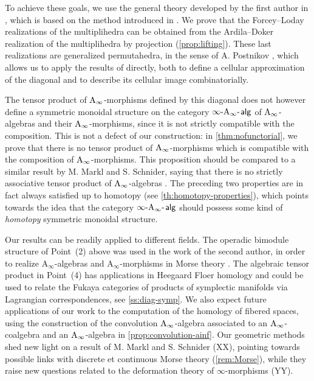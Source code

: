 \documentclass[twoside, 11pt]{amsart}
\theoremstyle{remark}
\begin{document}
To achieve these goals, we use the general theory developed by the first author in \cite{LA21}, which is based on the method introduced in \cite{MTTV19}.
We prove that the Forcey--Loday realizations of the multiplihedra \cite{Forcey08} can be obtained from the Ardila--Doker realization of the multiplihedra \cite{AD13} by projection (\cref{prop:lifting}).
These last realizations are generalized permutahedra, in the sense of A. Postnikov \cite{Postnikov09}, which allows us to apply the results of \cite{LA21} directly, both to define a cellular approximation of the diagonal and to describe its cellular image combinatorially.

The tensor product of $\mathrm{A}_\infty$-morphisms defined by this diagonal does not however define a symmetric monoidal structure on the category $\infty\text{-}\mathrm{A}_\infty\text{-\hspace{1pt}}\mathsf{alg}$ of $\mathrm{A}_\infty$-algebras and their $\mathrm{A}_\infty$-morphisms, since it is not strictly compatible with the composition. 
This is not a defect of our construction: in \cref{thm:nofunctorial}, we prove that there is no tensor product of $\mathrm{A}_\infty$-morphisms which is compatible with the composition of $\mathrm{A}_\infty$-morphisms. 
This proposition should be compared to a similar result by M. Markl and S. Schnider, saying that there is no strictly associative tensor product of $\mathrm{A}_\infty$-algebras \cite[Theorem 13]{MarklShnider06}.
The preceding two properties are in fact always satisfied up to homotopy (see \cref{th:homotopy-properties}), which points towards the idea that the category $\infty\text{-}\mathrm{A}_\infty\text{-\hspace{1pt}}\mathsf{alg}$ should possess some kind of \textit{homotopy} symmetric monoidal structure. 


Our results can be readily applied to different fields. 
The operadic bimodule structure of Point~(2) above was used in the work of the second author, in order to realize $\mathrm{A}_\infty$-algebras and $\mathrm{A}_\infty$-morphisms in Morse theory \cite{mazuir-I,mazuir-II}. 
The algebraic tensor product in Point~(4) has applications in Heegaard Floer homology and could be used to relate the Fukaya categories of products of symplectic manifolds via Lagrangian correspondences, see \cref{ss:diag-symp}.
We also expect future applications of our work to the computation of the homology of fibered spaces, using the construction of the convolution $\mathrm{A}_\infty$-algebra associated to an $\mathrm{A}_\infty$-coalgebra and an $\mathrm{A}_\infty$-algebra in \cref{prop:convolution-ainf}.
Our geometric methods shed new light on a result of M. Markl and S. Schnider \cite{MarklShnider06} (XX), pointing towards possible links with discrete et continuous Morse theory (\cref{rem:Morse}), while they raise new questions related to the deformation theory of $\infty$-morphisms \cite{RobertNicoudWierstraI,RobertNicoudWierstraII} (YY). 
\end{document}
